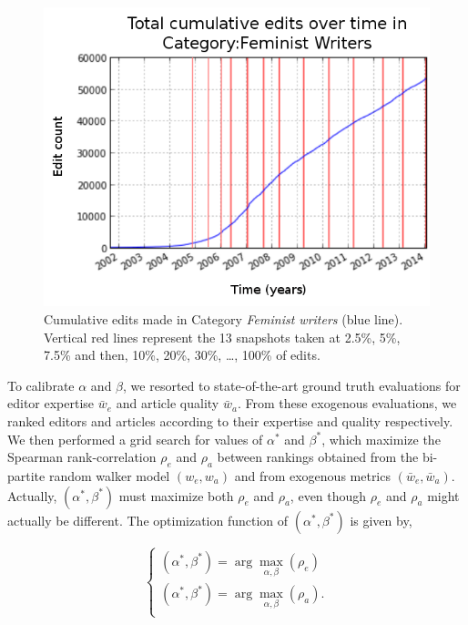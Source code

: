 \begin{figure}[!t]
\centering
\includegraphics[width=0.9\columnwidth]{../Figures/cumulative_snapshots_Feminist_Writers_thirteen.png}
\caption{Cumulative edits made in Category {\it Feminist writers} (blue line). Vertical red lines represent the 13 snapshots taken at 2.5\%, 5\%, 7.5\% and then, 10\%, 20\%, 30\%, \ldots , 100\% of edits.}
\label{fig:snapshots}
\end{figure}

To calibrate $\alpha$ and $\beta$, we resorted to state-of-the-art ground truth evaluations for editor expertise $\bar{w}_e$ and article quality $\bar{w}_a$. From these exogenous evaluations, we ranked editors and articles according to their expertise and quality respectively. We then performed  a grid search for values of $\alpha^*$ and $\beta^*$, which maximize the Spearman rank-correlation $\rho_e$ and $\rho_a$ between rankings obtained from the bi-partite random walker model $(w_e,w_a)$ and from exogenous metrics $(\bar{w}_e,\bar{w}_a)$. Actually, $(\alpha^*,\beta^*)$ must maximize both $\rho_e$ and $\rho_a$, even though $\rho_e$ and $\rho_a$ might actually be different. The optimization function  of $(\alpha^*,\beta^*)$ is given by,

\newcommand{\argmax}{\arg\!\max}

\begin{equation}
\begin{cases}
(\alpha^*,\beta^*) = \argmax_{\alpha, \beta}(\rho_e)\\
(\alpha^*,\beta^*) =\argmax_{\alpha, \beta}(\rho_a).\\
\end{cases}
\end{equation}

